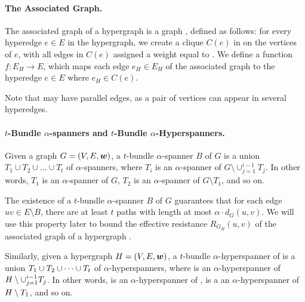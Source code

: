 \paragraph{The Associated Graph.}
The associated graph of a hypergraph  is a graph , defined as follows: for every hyperedge \( e \in E \) in the hypergraph, we create a clique \( C(e) \) in  on the vertices of \( e \), with all edges in \( C(e) \) assigned a weight equal to .
We define a function \( f \colon E_H \to E \), which maps each edge \( e_H \in E_H  \) of the associated graph  to the hyperedge \( e \in E \) where \( e_H \in C(e) \).

Note that  may have parallel edges, as a pair of vertices can appear in several hyperedges.













\paragraph{\( t \)-Bundle \( \alpha \)-spanners and \( t \)-Bundle \( \alpha \)-Hyperspanners.}

Given a graph \( G = (V, E, \boldsymbol{w}) \), a \( t \)-bundle \( \alpha \)-spanner \( B \) of \( G \) is a union \( T_1 \cup T_2 \cup \dots \cup T_t \) of \( \alpha \)-spanners, where \( T_i \) is an \( \alpha \)-spanner of \( G \setminus \cup_{j = 1} ^{i-1} T_j \).
In other words, \( T_1 \) is an \( \alpha \)-spanner of \( G \), \( T_2 \) is an \( \alpha \)-spanner of \( G \setminus T_1 \), and so on.

The existence of a \( t \)-bundle \( \alpha \)-spanner \( B \) of \( G \) guarantees that for each edge \( uv \in E \setminus B \), there are at least \( t \) paths with length at most \( \alpha \cdot d_G(u,v) \).
We will use this property later to bound the effective resistance \( R_{G_H}(u, v) \) of the associated graph  of a hypergraph .



Similarly, given a hypergraph \( { H} = (V, E, \boldsymbol{w}) \), a \( t \)-bundle \( \alpha \)-hyperspanner  of  is a union \(  { T_1} \cup {\ensuremath{ T_2}} \cup \dots \cup {\ensuremath{ T_t}} \) of \( \alpha \)-hyperspanners, where  is an \( \alpha \)-hyperspanner of \( { H} \setminus \cup_{j = 1} ^{i-1} { T_j} \).
In other words,  is an \( \alpha \)-hyperspanner of ,  is a an \( \alpha \)-hyperspanner of \( { H} \setminus {\ensuremath{ T_1}} \), and so on.


